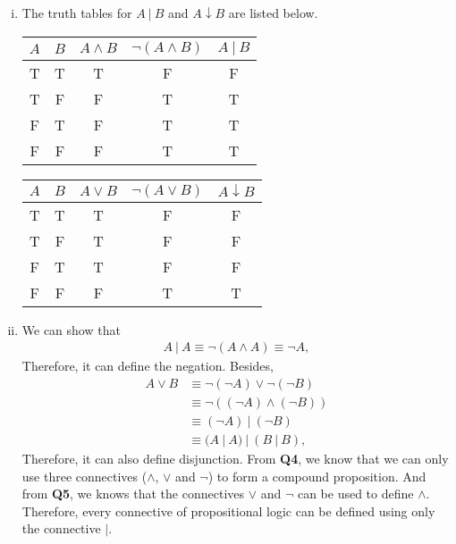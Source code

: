 \documentclass{article}[12pt]
\begin{document}
\begin{enumerate}[(i)]
\item The truth tables for $A\ |\ B$ and $A \downarrow B$ are listed below.
\begin{table}[H]
\centering
\begin{tabular}{c|c||c|c||c}
$A$ & $B$ & $A \wedge B$ & $\neg (A \wedge B)$ & $A\ |\ B$ \\ \hline
T   & T   & T            & F                   & F     \\
T   & F   & F            & T                   & T     \\
F   & T   & F            & T                   & T     \\
F   & F   & F            & T                   & T    
\end{tabular}
\end{table}

\begin{table}[H]
\centering
\begin{tabular}{c|c||c|c||c}
$A$ & $B$ & $A \vee B$ & $\neg (A \vee B)$ & $A \downarrow B$ \\ \hline
T   & T   & T          & F                   & F     \\
T   & F   & T          & F                   & F     \\
F   & T   & T          & F                   & F     \\
F   & F   & F          & T                   & T    
\end{tabular}
\end{table}
\item We can show that 
\begin{align*}
A\ |\ A \equiv \neg (A\wedge A)\equiv \neg A,
\end{align*}
Therefore, it can define the negation.
Besides, 
\begin{align*}
A\vee B &\equiv \neg (\neg A) \vee \neg (\neg B)\\
&\equiv \neg ((\neg A) \wedge (\neg B))\\
&\equiv (\neg A) \ |\ (\neg B)\\
&\equiv (A\ |\ A)\ |\ (B\ |\ B),
\end{align*}
Therefore, it can also define disjunction. From \textbf{Q4}, we know that we can only use three connectives ($\wedge$, $\vee$ and $\neg$) to form a compound proposition. And from \textbf{Q5}, we knows that the connectives $\vee$ and $\neg$ can be used to define $\wedge$. Therefore, every connective of propositional logic can be defined using only the connective $|$.


\end{enumerate}
\end{document}
